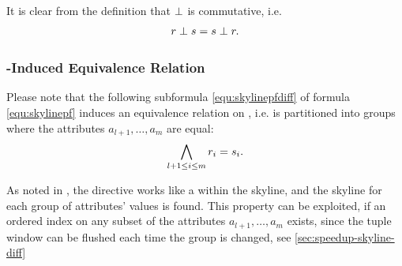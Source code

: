 \noindent
It is clear from the definition that $\perp$ is commutative, i.e.
\[
r \perp s = s \perp r.
\]


%

\subsubsection{-Induced Equivalence Relation}
Please note that the following subformula \eqref{equ:skylinepfdiff} of
formula \eqref{equ:skylinepf} induces an equivalence relation on
, i.e.  is partitioned into groups where the
attributes $a_{l+1}, \ldots, a_m$ are equal:
\begin{equation}\label{equ:skylinepfdiff}
\bigwedge_{l+1 \le i \le m} r_i = s_i.
\end{equation}

As noted in \citep{Chomicki2003}, the  directive works
like a  within the skyline, and the skyline for
each group of  attributes' values is found.
%
This property can be exploited, if an ordered index on any subset of
the attributes $a_{l+1}, \ldots, a_m$ exists, since the tuple window
can be flushed each time the group is changed, see
\autoref{sec:speedup-skyline-diff}

%
% 


